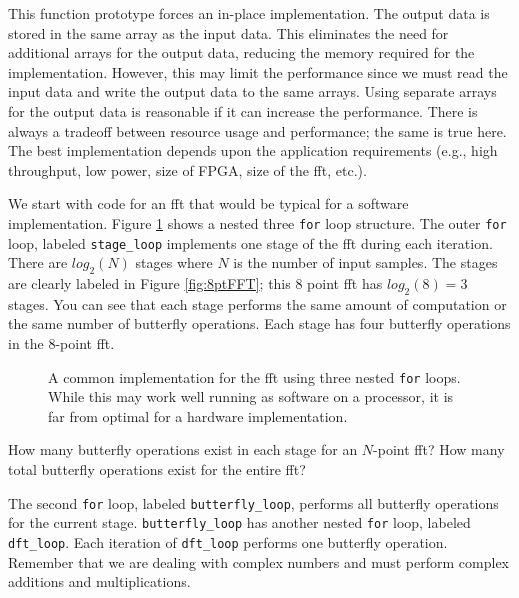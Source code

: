This function prototype forces an in-place implementation. The output data is stored in the same array as the input data. This eliminates the need for additional arrays for the output data, reducing the memory required for the implementation. However, this may limit the performance since we must read the input data and write the output data to the same arrays. Using separate arrays for the output data is reasonable if it can increase the performance. There is always a tradeoff between resource usage and performance; the same is true here. The best implementation depends upon the application requirements (e.g., high throughput, low power, size of FPGA, size of the \gls{fft}, etc.).


We start with code for an \gls{fft} that would be typical for a software implementation. Figure \ref{fig:fft_sw} shows a nested three \lstinline|for| loop structure. The outer \lstinline|for| loop, labeled \lstinline|stage_loop| implements one stage of the \gls{fft} during each iteration. There are $log_2(N)$ stages where $N$ is the number of input samples. The stages are clearly labeled in Figure \ref{fig:8ptFFT}; this 8 point \gls{fft} has $log_2(8) = 3$ stages. You can see that each stage performs the same amount of computation or the same number of butterfly operations. Each stage has four butterfly operations in the 8-point \gls{fft}. 

\begin{figure}

\caption{ A common implementation for the \gls{fft} using three nested \lstinline|for| loops.  While this may work well running as software on a processor, it is far from optimal for a hardware implementation.}
\label{fig:fft_sw}
\end{figure}

\begin{exercise}
How many butterfly operations exist in each stage for an $N$-point \gls{fft}? How many total butterfly operations exist for the entire \gls{fft}?
\end{exercise}

The second \lstinline|for| loop, labeled \lstinline|butterfly_loop|, performs all butterfly operations for the current stage. \lstinline|butterfly_loop| has another nested \lstinline|for| loop, labeled \lstinline|dft_loop|. Each iteration of \lstinline|dft_loop| performs one butterfly operation. Remember that we are dealing with complex numbers and must perform complex additions and multiplications. 

